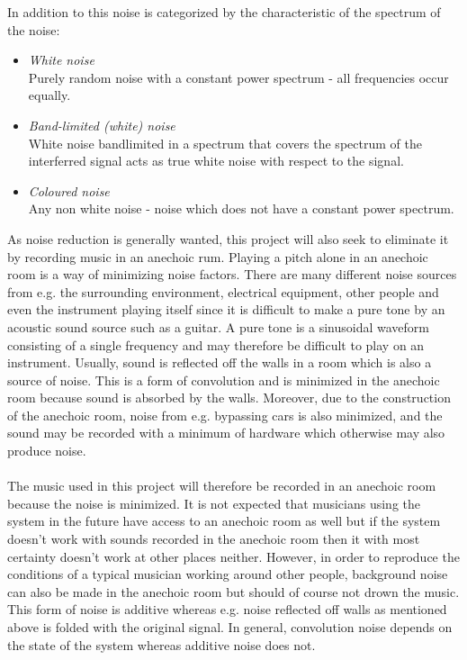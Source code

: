 In addition to this noise is categorized by the characteristic of the spectrum of the noise:
\begin{itemize}
\item \textit{White noise}\\
Purely random noise with a constant power spectrum - all frequencies occur equally.
\item \textit{Band-limited (white) noise}\\
White noise bandlimited in a spectrum that covers the spectrum of the interferred signal acts as true white noise with respect to the signal.
\item \textit{Coloured noise}\\
Any non white noise - noise which does not have a constant power spectrum.
\end{itemize}
As noise reduction is generally wanted, this project will also seek to eliminate it by recording music in an anechoic rum. Playing a pitch alone in an anechoic room is a way of minimizing noise factors. There are many different noise sources from e.g. the surrounding environment, electrical equipment, other people and even the instrument playing itself since it is difficult to make a pure tone by an acoustic sound source such as a guitar. A pure tone is a sinusoidal waveform consisting of a single frequency and may therefore be difficult to play on an instrument. \cite{AcousticNoise} Usually, sound is reflected off the walls in a room which is also a source of noise. This is a form of convolution and is minimized in the anechoic room because sound is absorbed by the walls. Moreover, due to the construction of the anechoic room, noise from e.g. bypassing cars is also minimized, and the sound may be recorded with a minimum of hardware which otherwise may also produce noise.
\\ \\
The music used in this project will therefore be recorded in an anechoic room because the noise is minimized. It is not expected that musicians using the system in the future have access to an anechoic room as well but if the system doesn't work with sounds recorded in the anechoic room then it with most certainty doesn't work at other places neither. However, in order to reproduce the conditions of a typical musician working around other people, background noise can also be made in the anechoic room but should of course not drown the music. This form of noise is additive whereas e.g. noise reflected off walls as mentioned above is folded with the original signal. In general, convolution noise depends on the state of the system whereas additive noise does not.
